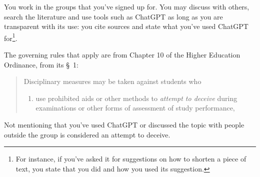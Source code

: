 You work in the groups that you've signed up for.
You may discuss with others, search the literature and use tools such as 
ChatGPT as long as you are transparent with its use:
\ie you cite sources and state what you've used ChatGPT for\footnote{%
  For instance, if you've asked it for suggestions on how to shorten a piece of 
  text, you state that you did and how you used its suggestion.
}.

The governing rules that apply are from Chapter 10 of the Higher Education 
Ordinance, from its \S~1:
\begin{quote}
  Disciplinary measures may be taken against students who
  \begin{enumerate}
    \item use prohibited aids or other methods to \emph{attempt to deceive} 
       during examinations or other forms of assessment of 
      study performance,
  \end{enumerate}
\end{quote}

Not mentioning that you've used ChatGPT or discussed the topic with people 
outside the group is considered an attempt to deceive.

